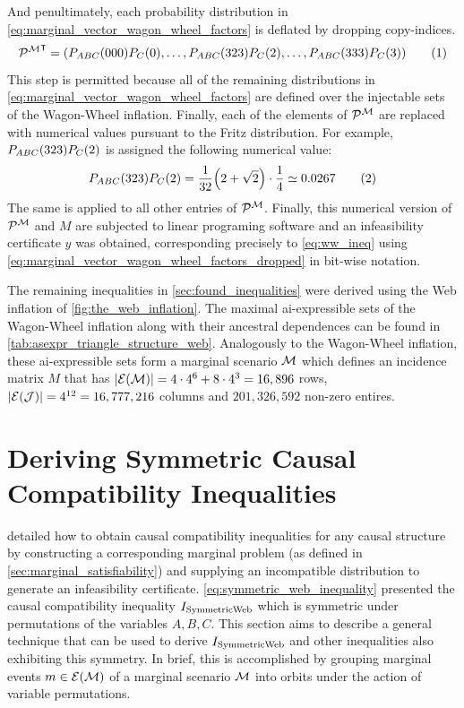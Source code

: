 \documentclass[aps, 10pt, english, twoside, pra, nofootinbib, tightenlines, longbibliography, superscriptaddress]{revtex4-1}
\begin{document}
    And penultimately, each probability distribution in \cref{eq:marginal_vector_wagon_wheel_factors} is deflated by dropping copy-indices.
    \[ {\probvec^{\mscenario}}^{\intercal} = \br{\prob[ABC]\br{000}\prob[C]\br{0}, \ldots, \prob[ABC]\br{323}\prob[C]\br{2}, \ldots, \prob[ABC]\br{333}\prob[C]\br{3}} \eq \label{eq:marginal_vector_wagon_wheel_factors_dropped}\]
    This step is permitted because all of the remaining distributions in \cref{eq:marginal_vector_wagon_wheel_factors} are defined over the injectable sets of the Wagon-Wheel inflation. Finally, each of the elements of $\probvec^{\mscenario}$ are replaced with numerical values pursuant to the Fritz distribution. For example, $\prob[ABC]\br{323}\prob[C]\br{2}$ is assigned the following numerical value:
    \[ \prob[ABC]\br{323}\prob[C]\br{2} = \f{1}{32}\br{2 + \sqrt{2}} \cdot \f{1}{4} \simeq 0.0267 \eq \]
    The same is applied to all other entries of $\probvec^{\mscenario}$. Finally, this numerical version of $\probvec^{\mscenario}$ and $M$ are subjected to linear programing software and an infeasibility certificate $y$ was obtained, corresponding precisely to \cref{eq:ww_ineq} using \cref{eq:marginal_vector_wagon_wheel_factors_dropped} in bit-wise notation.

    The remaining inequalities in \cref{sec:found_inequalities} were derived using the Web inflation of \cref{fig:the_web_inflation}. The maximal ai-expressible sets of the Wagon-Wheel inflation along with their ancestral dependences can be found in \cref{tab:asexpr_triangle_structure_web}. Analogously to the Wagon-Wheel inflation, these ai-expressible sets form a marginal scenario $\mathcal{M}$ which defines an incidence matrix $M$ that has $\abs{\Events{\mscenario}} = 4 \cdot 4^{6} + 8 \cdot 4^3 = 16,896$ rows, $\abs{\Events{\jointvar}} = 4^{12} = 16,777,216$ columns and $201,326,592$ non-zero entires.

    \section{Deriving Symmetric Causal Compatibility Inequalities}
    \label{sec:symmetric_inequalities}

     detailed how to obtain causal compatibility inequalities for any causal structure by constructing a corresponding marginal problem (as defined in \cref{sec:marginal_satisfiability}) and supplying an incompatible distribution to generate an infeasibility certificate. \cref{eq:symmetric_web_inequality} presented the causal compatibility inequality $I_\text{SymmetricWeb}$ which is symmetric under permutations of the variables $A,B,C$. This section aims to describe a general technique that can be used to derive  $I_\text{SymmetricWeb}$ and other inequalities also exhibiting this symmetry. In brief, this is accomplished by grouping marginal events $m \in \Events{\mscenario}$ of a marginal scenario $\mathcal{M}$ into orbits under the action of variable permutations.
\end{document}
